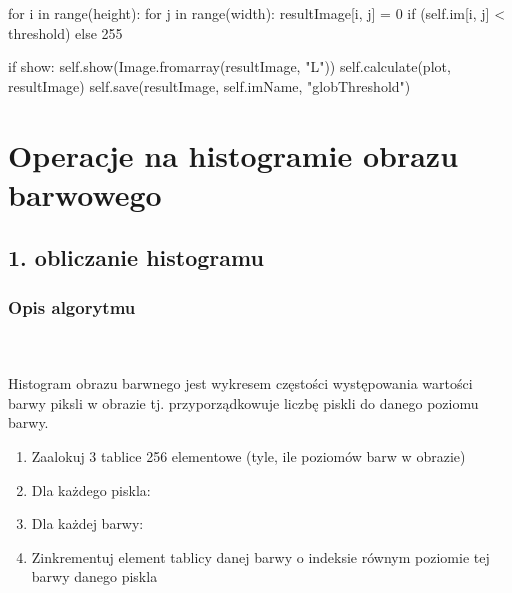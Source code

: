 \documentclass[final,a4paper,openany,12pt]{mwbk}
\begin{document}
\indent \indent \indent for i in range(height): \newline
\indent \indent \indent for j in range(width): \newline
\indent \indent \indent resultImage[i, j] = 0 if (self.im[i, j] < threshold) else 255 \newline

\indent \indent \indent if show: \newline
\indent \indent \indent self.show(Image.fromarray(resultImage, "L")) \newline
\indent \indent \indent self.calculate(plot, resultImage) \newline
\indent \indent \indent self.save(resultImage, self.imName, "globThreshold") \newline
\newpage






\chapter{Operacje na histogramie obrazu barwowego}
\pagebreak
\section*{1. obliczanie histogramu}
\subsection*{Opis algorytmu}
\hfill
\\\\
\indent Histogram obrazu barwnego jest wykresem częstości występowania wartości barwy piksli w obrazie tj.
przyporządkowuje liczbę piskli do danego poziomu barwy.\newline
\begin{enumerate}
	\item Zaalokuj 3 tablice 256 elementowe (tyle, ile poziomów barw w obrazie)
	\item Dla każdego piskla:
	\item Dla każdej barwy:
	\item Zinkrementuj element tablicy danej barwy o indeksie równym poziomie tej barwy danego piskla
\end{enumerate}
\end{document}
